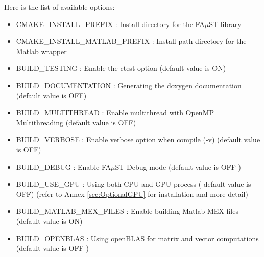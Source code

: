 Here is the list of available options: 
\begin{itemize}
\item CMAKE\_INSTALL\_PREFIX : Install directory for the FA$\mu$ST library
\item CMAKE\_INSTALL\_MATLAB\_PREFIX : Install path directory for the Matlab wrapper
\item BUILD\_TESTING : Enable the ctest option (default value is ON)
\item BUILD\_DOCUMENTATION : Generating the doxygen documentation (default value is OFF)  
\item BUILD\_MULTITHREAD : Enable multithread with OpenMP Multithreading (default value is OFF)
\item BUILD\_VERBOSE : Enable verbose option when compile (-v) (default value is OFF)
\item BUILD\_DEBUG : Enable FA$\mu$ST Debug mode (default value is OFF )
\item BUILD\_USE\_GPU : Using both CPU and GPU process ( default value is OFF) (refer to Annex \ref{sec:OptionalGPU} for installation and more detail)
\item BUILD\_MATLAB\_MEX\_FILES : Enable building Matlab MEX files (default value is ON)
\item BUILD\_OPENBLAS : Using openBLAS for matrix and vector computations (default value is OFF )

\end{itemize}






